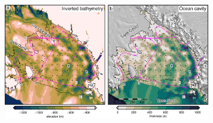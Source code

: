 \begin{figure}[p]
  \centering
    \begin{subfigure}[t]{.8\textwidth}
        \includegraphics[width=\textwidth]{figures/chp4/RIS_profile_locations.png}
    \end{subfigure}
    

\end{figure}
